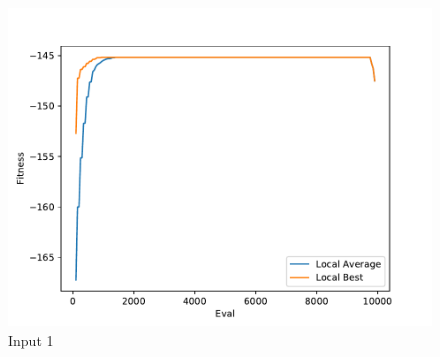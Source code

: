 \documentclass{standalone}
\begin{document}
\begin{figure}[!htb]
	\caption{Input 1}
	\label{fig:graph_1046}
	\includegraphics[width=\textwidth]{../graphs/graphs/1046.pdf}
\end{figure}
\end{document}

